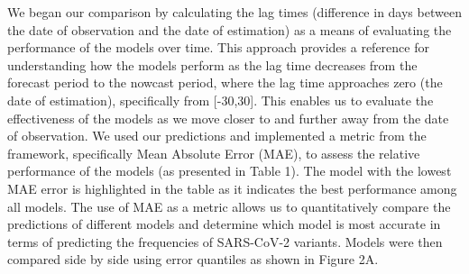 \documentclass[11pt,oneside,letterpaper]{article}
\begin{document}
We began our comparison by calculating the lag times (difference in days between the date of observation and the date of estimation) as a means of evaluating the performance of the models over time.
This approach provides a reference for understanding how the models perform as the lag time decreases from the forecast period to the nowcast period, where the lag time approaches zero (the date of estimation), specifically from [-30,30].
This enables us to evaluate the effectiveness of the models as we move closer to and further away from the date of observation.
We used our predictions and implemented a metric from the framework, specifically Mean Absolute Error (MAE), to assess the relative performance of the models (as presented in Table 1).
The model with the lowest MAE error is highlighted in the table as it indicates the best performance among all models. 
The use of MAE as a metric allows us to quantitatively compare the predictions of different models and determine which model is most accurate in terms of predicting the frequencies of SARS-CoV-2 variants.
Models were then compared side by side using error quantiles as shown in Figure 2A.






% 




%
\end{document}
